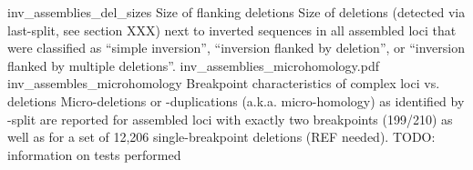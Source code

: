     {inv_assemblies_del_sizes}
    {Size of flanking deletions}
    {Size of deletions (detected via \acs{last}-split, see section XXX) next to
    inverted sequences in all assembled loci that were classified as
    ``simple inversion'', ``inversion flanked by deletion'', or ``inversion
    flanked by multiple deletions''.}
        {inv_assemblies_microhomology.pdf}
    {inv_assembles_microhomology}
    {Breakpoint characteristics of complex loci vs. deletions}
    {Micro-deletions or -duplications (a.k.a. micro-homology) as identified by
    \last-split are reported for assembled loci with exactly two breakpoints
    (199/210) as well as for a set of 12,206 single-breakpoint deletions (REF needed).
    TODO: information on tests performed}

